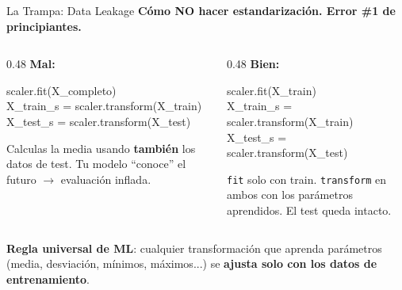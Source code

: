 \documentclass[aspectratio=169, 11pt]{beamer}
\begin{document}
\begin{frame}[shrink=8]{La Trampa: Data Leakage}
  \vspace{-4pt}
  {\footnotesize\color{arcaDark}\bfseries
    Cómo \textbf{NO} hacer estandarización. Error \#1 de principiantes.}

  \vspace{6pt}
  \begin{columns}[T]
    \begin{column}{0.48\textwidth}
      {\footnotesize\color{arcaRed}\bfseries\faTimesCircle\hspace{4pt}
        Mal:}
      \vspace{4pt}

      \begin{tcolorbox}[colback=arcaGray, colframe=arcaRed, boxrule=0.5pt,
                        arc=2pt, fontupper=\scriptsize\ttfamily]
scaler.fit(X\_completo)\\
X\_train\_s = scaler.transform(X\_train)\\
X\_test\_s  = scaler.transform(X\_test)
      \end{tcolorbox}

      \vspace{4pt}
      {\scriptsize\color{arcaRed}
      Calculas la media usando \textbf{también} los datos de test.
      Tu modelo ``conoce'' el futuro $\to$ evaluación inflada.}
    \end{column}

    \begin{column}{0.48\textwidth}
      {\footnotesize\color{codeGreen}\bfseries\faCheckCircle\hspace{4pt}
        Bien:}
      \vspace{4pt}

      \begin{tcolorbox}[colback=arcaGray, colframe=codeGreen, boxrule=0.5pt,
                        arc=2pt, fontupper=\scriptsize\ttfamily]
scaler.fit(X\_train)\\
X\_train\_s = scaler.transform(X\_train)\\
X\_test\_s  = scaler.transform(X\_test)
      \end{tcolorbox}

      \vspace{4pt}
      {\scriptsize\color{codeGreen}
      \texttt{fit} solo con train. \texttt{transform} en ambos
      con los parámetros aprendidos. El test queda intacto.}
    \end{column}
  \end{columns}

  \vspace{6pt}
  {\footnotesize\color{arcaDark}
    \faLightbulb\hspace{4pt}
    \textbf{Regla universal de ML}: cualquier transformación que
    aprenda parámetros (media, desviación, mínimos, máximos...) se
    \textbf{ajusta solo con los datos de entrenamiento}.}
\end{frame}
\end{document}
